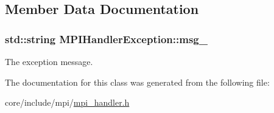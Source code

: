 \subsection{Member Data Documentation}
\hypertarget{classMPIHandlerException_ac42d97ce539575b3eece7759cddf763e}{}
\subsubsection[{msg\+\_\+}]{\setlength{\rightskip}{0pt plus 5cm}std\+::string M\+P\+I\+Handler\+Exception\+::msg\+\_\+\hspace{0.3cm}{\ttfamily [private]}}\label{classMPIHandlerException_ac42d97ce539575b3eece7759cddf763e}
The exception message. 

The documentation for this class was generated from the following file\+:\begin{DoxyCompactItemize}
\item 
core/include/mpi/\hyperlink{mpi__handler_8h}{mpi\+\_\+handler.\+h}\end{DoxyCompactItemize}

